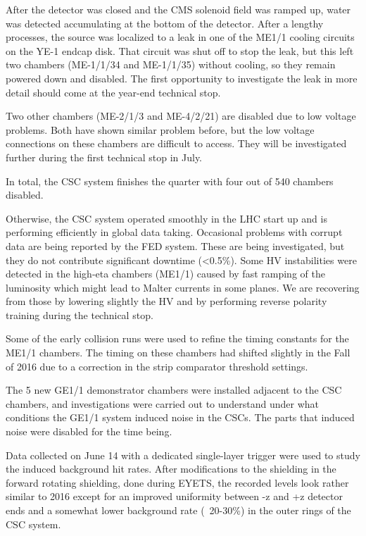 After the detector was closed and the CMS solenoid field was ramped up, water was 
detected accumulating at the bottom of the detector.  After a lengthy processes,
the source was localized to a leak in one of the ME1/1 cooling circuits on the YE-1 endcap disk.
That circuit was shut off to stop the leak, but this left two chambers 
(ME-1/1/34 and ME-1/1/35) without cooling, so they remain powered down and disabled.
The first opportunity to investigate the leak in more detail should come at 
the year-end technical stop.  

Two other chambers (ME-2/1/3 and ME-4/2/21) are disabled due to low voltage problems. Both have shown  similar problem before, but the low voltage connections on these chambers are difficult to access.  They will be investigated further during the first technical stop in July.

In total, the CSC system finishes the quarter with four out of 540 chambers disabled.

Otherwise, the CSC system operated smoothly in the LHC start up and is performing
efficiently in global data taking. Occasional problems with corrupt data are being 
reported by the FED system.  These are being investigated, but they do not contribute
 significant downtime (<0.5\%). Some HV instabilities were detected in the high-eta chambers (ME1/1) caused by fast ramping of the luminosity which might lead to Malter currents in some planes. We are recovering from those by lowering slightly the HV and by performing reverse polarity training during the technical stop.

Some of the early collision runs were used to refine the timing constants for the 
ME1/1 chambers.  The timing on these chambers had shifted slightly in the Fall of
 2016 due to a correction in the strip comparator threshold settings.

The 5 new GE1/1 demonstrator chambers were installed adjacent to the CSC chambers,
and investigations were carried out to understand under what conditions the GE1/1
system induced noise in the CSCs.  The parts that induced noise were disabled for
 the time being. 

Data collected on June 14 with a dedicated single-layer trigger were used to study the induced background hit rates. After modifications to the shielding in the forward rotating shielding, done during EYETS, the recorded levels look rather similar to 2016 except for an improved uniformity between -z and +z detector ends and a somewhat lower background rate (~20-30\%) in the outer rings of the CSC system.


